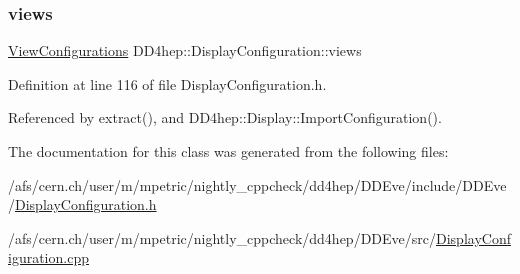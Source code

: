 \subsubsection{\texorpdfstring{views}{views}}
{\footnotesize\ttfamily \hyperlink{class_d_d4hep_1_1_display_configuration_a38d6c82b57ac859a5d5cf67fe26f4920}{View\+Configurations} D\+D4hep\+::\+Display\+Configuration\+::views}



Definition at line 116 of file Display\+Configuration.\+h.



Referenced by extract(), and D\+D4hep\+::\+Display\+::\+Import\+Configuration().



The documentation for this class was generated from the following files\+:\begin{DoxyCompactItemize}
\item 
/afs/cern.\+ch/user/m/mpetric/nightly\+\_\+cppcheck/dd4hep/\+D\+D\+Eve/include/\+D\+D\+Eve/\hyperlink{_display_configuration_8h}{Display\+Configuration.\+h}\item 
/afs/cern.\+ch/user/m/mpetric/nightly\+\_\+cppcheck/dd4hep/\+D\+D\+Eve/src/\hyperlink{_display_configuration_8cpp}{Display\+Configuration.\+cpp}\end{DoxyCompactItemize}
